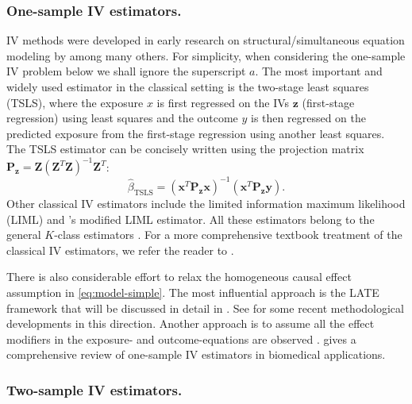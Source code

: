 \documentclass[preprint]{imsart}
\begin{document}
\subsubsection{One-sample IV estimators.}
\label{sec:class-iv-estim}

IV methods were developed in early research on structural/simultaneous
equation modeling by
\citet{wright1928tariff,anderson1949estimation,theil1958economic}
among many others. For simplicity, when
considering the one-sample IV problem below we shall ignore the
superscript $a$.  The most important and widely used estimator in the
classical setting is the two-stage least squares (TSLS), where the
exposure $x$ is first regressed on the IVs $\bm z$ (first-stage
regression) using least squares and the outcome $y$ is then regressed
on the predicted exposure from the first-stage regression using
another least squares. The TSLS estimator can be concisely written
using the projection matrix $\mathbf{P}_{\mathbf z} = \mathbf{Z} (\mathbf{Z}^T
\mathbf{Z})^{-1} \mathbf{Z}^T$:
\[
\hat{\beta}_{\text{TSLS}} = (\mathbf{x}^T \mathbf{P}_{\mathbf z}
\mathbf{x})^{-1} (\mathbf{x}^T \mathbf{P}_{\mathbf z} \mathbf{y}).
\]
Other classical IV estimators include the limited information maximum
likelihood (LIML) \citep{anderson1949estimation} and \citet{fuller1977some}'s modified LIML estimator. All these estimators
belong to the general $K$-class estimators \citep{theil1958economic}. For
a more comprehensive textbook treatment of the classical IV estimators, we
refer the reader to \citet{davidson1993estimation}.

There is also considerable effort to relax the homogeneous causal
effect assumption in \eqref{eq:model-simple}. The most influential
approach is the LATE framework \citep{imbens1994identification,baker1994paired,angrist1996identification} that
will be discussed in detail in . See
\citet{abadie2003semiparametric,ogburn2015doubly} for some recent
methodological developments in this direction. Another
approach is to assume all the effect modifiers in the exposure- and
outcome-equations are observed
\citep{hernan2006instruments,wang2018bounded}. \citet{baiocchi2014instrumental}
gives a comprehensive review of one-sample IV estimators in biomedical applications.

\subsubsection{Two-sample IV estimators.}
\label{sec:two-sample-instr}
\end{document}
